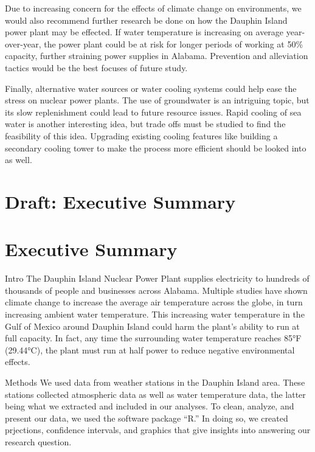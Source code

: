 \documentclass[
  letterpaper,
  DIV=11,
  numbers=noendperiod]{scrreprt}
\begin{document}
Due to increasing concern for the effects of climate change on
environments, we would also recommend further research be done on how
the Dauphin Island power plant may be effected. If water temperature is
increasing on average year-over-year, the power plant could be at risk
for longer periods of working at 50\% capacity, further straining power
supplies in Alabama. Prevention and alleviation tactics would be the
best focuses of future study.

Finally, alternative water sources or water cooling systems could help
ease the stress on nuclear power plants. The use of groundwater is an
intriguing topic, but its slow replenishment could lead to future
resource issues. Rapid cooling of sea water is another interesting idea,
but trade offs must be studied to find the feasibility of this idea.
Upgrading existing cooling features like building a secondary cooling
tower to make the process more efficient should be looked into as well.

\chapter{Draft: Executive Summary}\label{draft-executive-summary}

\chapter{Executive Summary}\label{executive-summary-1}

Intro The Dauphin Island Nuclear Power Plant supplies electricity to
hundreds of thousands of people and businesses across Alabama. Multiple
studies have shown climate change to increase the average air
temperature across the globe, in turn increasing ambient water
temperature. This increasing water temperature in the Gulf of Mexico
around Dauphin Island could harm the plant's ability to run at full
capacity. In fact, any time the surrounding water temperature reaches
85°F (29.44°C), the plant must run at half power to reduce negative
environmental effects.

Methods We used data from weather stations in the Dauphin Island area.
These stations collected atmospheric data as well as water temperature
data, the latter being what we extracted and included in our analyses.
To clean, analyze, and present our data, we used the software package
``R.'' In doing so, we created prjections, confidence intervals, and
graphics that give insights into answering our research question.
\end{document}

